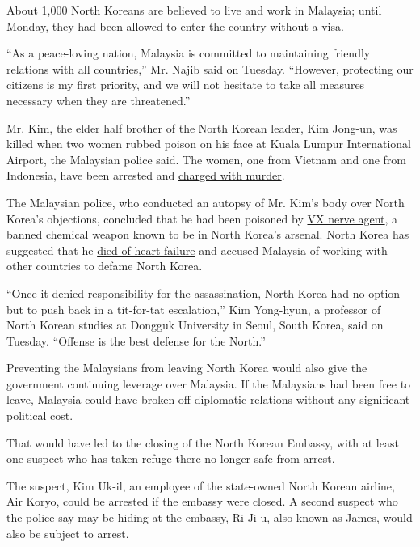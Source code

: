 About 1,000 North Koreans are believed to live and work in Malaysia;
until Monday, they had been allowed to enter the country without a visa.

``As a peace-loving nation, Malaysia is committed to maintaining
friendly relations with all countries,'' Mr. Najib said on Tuesday.
``However, protecting our citizens is my first priority, and we will not
hesitate to take all measures necessary when they are threatened.''

Mr. Kim, the elder half brother of the North Korean leader, Kim Jong-un,
was killed when two women rubbed poison on his face at Kuala Lumpur
International Airport, the Malaysian police said. The women, one from
Vietnam and one from Indonesia, have been arrested and
\href{https://www.nytimes.com/2017/02/28/world/asia/north-korea-kim-jong-nam-death.html}{charged
with murder}.

The Malaysian police, who conducted an autopsy of Mr. Kim's body over
North Korea's objections, concluded that he had been poisoned by
\href{https://www.nytimes.com/2017/02/24/world/asia/vx-nerve-agent-kim-jong-nam.html}{VX
nerve agent}, a banned chemical weapon known to be in North Korea's
arsenal. North Korea has suggested that he
\href{https://www.nytimes.com/2017/03/01/world/asia/kim-jong-nam-assassination-north-korea-visa-malaysia.html}{died
of heart failure} and accused Malaysia of working with other countries
to defame North Korea.

``Once it denied responsibility for the assassination, North Korea had
no option but to push back in a tit-for-tat escalation,'' Kim Yong-hyun,
a professor of North Korean studies at Dongguk University in Seoul,
South Korea, said on Tuesday. ``Offense is the best defense for the
North.''

Preventing the Malaysians from leaving North Korea would also give the
government continuing leverage over Malaysia. If the Malaysians had been
free to leave, Malaysia could have broken off diplomatic relations
without any significant political cost.

That would have led to the closing of the North Korean Embassy, with at
least one suspect who has taken refuge there no longer safe from arrest.

The suspect, Kim Uk-il, an employee of the state-owned North Korean
airline, Air Koryo, could be arrested if the embassy were closed. A
second suspect who the police say may be hiding at the embassy, Ri Ji-u,
also known as James, would also be subject to arrest.

